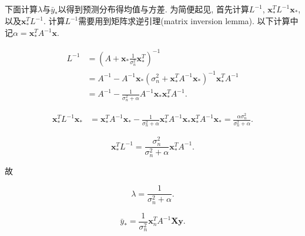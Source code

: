             下面计算$\lambda$与$\bar{y}_{*}$以得到预测分布得均值与方差. 为简便起见, 首先计算$L^{-1}$, $\boldsymbol{x}^{T}_{*}L^{-1}\boldsymbol{x}_{*}$, 以及$\boldsymbol{x}^{T}_{*}L^{-1}$. 计算$L^{-1}$需要用到矩阵求逆引理(matrix inversion lemma)\cite{rasmussen2006gaussian}. 以下计算中记$\alpha=\boldsymbol{x}^{T}_{*}A^{-1}\boldsymbol{x}$.

            \begin{equation}
                \begin{aligned} \label{A4.25}
                    L^{-1}
                    &=\left(A+\boldsymbol{x}_{*}\frac{1}{\sigma^{2}_{n}}\boldsymbol{x}^{T}_{*}\right)^{-1} \\
                    &=A^{-1}-A^{-1}\boldsymbol{x}_{*}(\sigma^{2}_{n}+\boldsymbol{x}^{T}_{*}A^{-1}\boldsymbol{x}_{*})^{-1}\boldsymbol{x}^{T}_{*}A^{-1} \\
                    &=A^{-1}-\frac{1}{\sigma^{2}_{n}+\alpha}A^{-1}\boldsymbol{x}_{*}\boldsymbol{x}^{T}_{*}A^{-1}.
                \end{aligned}
            \end{equation}

            \begin{equation}
                \begin{aligned} \label{A4.26}
                    \boldsymbol{x}^{T}_{*}L^{-1}\boldsymbol{x}_{*}
                    &=\boldsymbol{x}^{T}_{*}A^{-1}\boldsymbol{x}_{*}-\frac{1}{\sigma^{2}_{n}+\alpha}\boldsymbol{x}^{T}_{*}A^{-1}\boldsymbol{x}_{*}\boldsymbol{x}^{T}_{*}A^{-1}\boldsymbol{x}_{*}=\frac{\alpha \sigma^{2}_{n}}{\sigma^{2}_{n}+\alpha}.
                \end{aligned}
            \end{equation}

            \begin{equation}\label{A4.27}
                    \boldsymbol{x}^{T}_{*}L^{-1}=\frac{\sigma^{2}_{n}}{\sigma^{2}_{n}+\alpha} \boldsymbol{x}^{T}_{*}A^{-1}.
            \end{equation}

            故

            \begin{equation}\label{A4.28}
                \lambda=\frac{1}{\sigma^{2}_{n}+\alpha}.
            \end{equation}

            \begin{equation}\label{A4.29}
                \bar{y}_{*}=\frac{1}{\sigma^{2}_{n}}\boldsymbol{x}^{T}_{n}A^{-1}\boldsymbol{Xy}.
            \end{equation}

